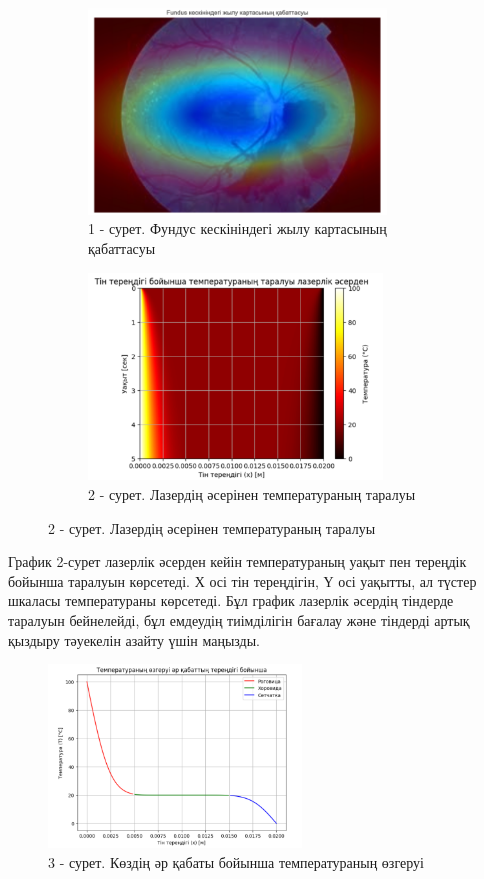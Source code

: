 \begin{figure}[H]
	\centering
	\begin{subfigure}[b]{0.45\textwidth}
		\centering
		\includegraphics[height=5.5cm]{media/ict/image20}
		\caption*{1 - сурет. Фундус кескініндегі жылу картасының қабаттасуы}
	\end{subfigure}
	\begin{subfigure}[b]{0.45\textwidth}
		\centering
		\includegraphics[height=5.5cm]{media/ict/image21}
		\caption*{2 - сурет. Лазердің әсерінен температураның таралуы}
	\end{subfigure}
\end{figure}

\begin{multicols}{2}
График 2-сурет лазерлік әсерден кейін температураның уақыт пен тереңдік
бойынша таралуын көрсетеді. Х осі тін тереңдігін, Ү осі уақытты, ал
түстер шкаласы температураны көрсетеді. Бұл график лазерлік әсердің
тіндерде таралуын бейнелейді, бұл емдеудің тиімділігін бағалау және
тіндерді артық қыздыру тәуекелін азайту үшін маңызды.
\end{multicols}

\begin{figure}[H]
	\centering
	\includegraphics[width=0.6\textwidth]{media/ict/image22}
	\caption*{3 - сурет. Көздің әр қабаты бойынша температураның өзгеруі}
\end{figure}

